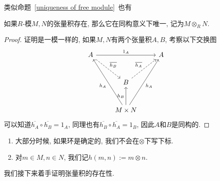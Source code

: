 类似命题~\ref{uniqueness of free module}~也有

\begin{prop}\label{uniqueness of tensor product}
    如果$R$-模$M,N$的张量积存在, 那么它在同构意义下唯一, 记为$M\otimes_R N$.
\end{prop}
\begin{proof}
    证明是一模一样的, 如果$M,N$有两个张量积$A,B$, 考察以下交换图
    \[\begin{tikzcd}[row sep=large]
        A \arrow[rr, "1_A"] \arrow[dr, dashed, "\overline{h_B}"] & & A\\
        & B \arrow[ur, dashed, "\overline{h_A}"] &\\
        & M\times N \arrow[uul, "h_A"] \arrow[u, "h_B"] \arrow[uur, "h_A"'] &
    \end{tikzcd}\]
    可以知道$\overline{h_A}\circ\overline{h_B}=1_A$, 同理也有$\overline{h_B}\circ\overline{h_A}=1_B$, 因此$A$和$B$是同构的.
\end{proof}

\begin{sym}
    \begin{enumerate}[(1)]
        \item 大部分时候, 如果环是确定的, 我们不会在$\otimes$下写下标.
        \item 对$m\in M,n\in N$, 我们记$h(m,n):=m\otimes n$.
    \end{enumerate}
\end{sym}

我们接下来着手证明张量积的存在性.

